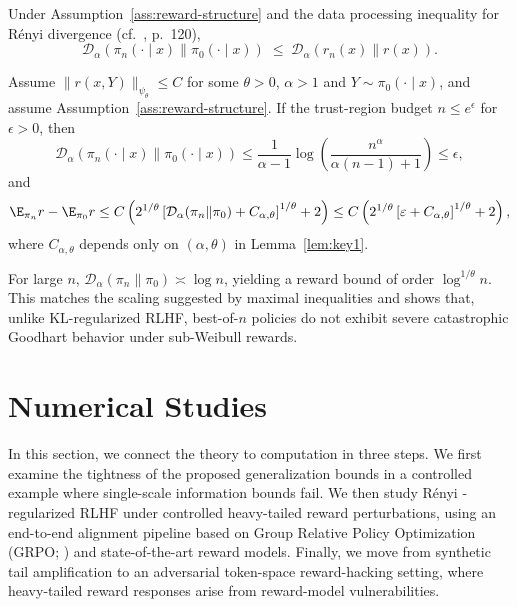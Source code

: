 \documentclass[11pt]{article}
\providecommand{\e}{\varepsilon}
\providecommand{\DD}{\mathcal{D}}
\providecommand{\Renyi}{R\'enyi }
\begin{document}
Under Assumption~\ref{ass:reward-structure} and the data processing inequality
for R\'enyi divergence (cf.\ \citealp{Yihong25}, p.~120),
\[
\DD_\alpha(\pi_n(\cdot\mid x)\|\pi_0(\cdot\mid x))
\;\le\;
\DD_\alpha(r_n(x)\|r(x)).
\]

\begin{theorem}\label{renyiregret}
Assume $\|r(x,Y)\|_{\psi_\theta}\le C$ for some $\theta>0$, $\alpha>1$ and
$Y\sim\pi_0(\cdot\mid x)$, and assume Assumption~\ref{ass:reward-structure}.
If the trust-region budget $n\le e^\epsilon$ for $\epsilon>0$, then
\[
\DD_\alpha(\pi_n(\cdot\mid x)\|\pi_0(\cdot\mid x))
\le \frac{1}{\alpha-1}\log\!\left(\frac{n^\alpha}{\alpha(n-1)+1}\right)
\le  \epsilon,
\]
and
\[
\E_{\pi_n}r-\E_{\pi_0}r
\le
C \left( 2^{1/\theta} \left[ \DD_\alpha(\pi_n \| \pi_0) +C_{\alpha,\theta}\right]^{1/\theta} + 2 \right)
\le
C \left( 2^{1/\theta} \left[ \e +C_{\alpha,\theta}\right]^{1/\theta} + 2\right),
\]
where $C_{\alpha,\theta}$ depends only on $(\alpha,\theta)$ in
Lemma~\ref{lem:key1}.
\end{theorem}

\begin{remark}
For large $n$, $\DD_\alpha(\pi_n\|\pi_0)\asymp\log n$, yielding a reward bound of
order $\log^{1/\theta}n$.  This matches the scaling suggested by maximal
inequalities and shows that, unlike KL-regularized RLHF, best-of-$n$ policies do
not exhibit severe catastrophic Goodhart behavior under sub-Weibull rewards.
\end{remark}

\section{Numerical Studies}\label{sec:experiments}

In this section, we connect the theory to computation in three steps. We first examine the tightness of the proposed generalization bounds in a controlled example where single-scale information bounds fail. We then study
\Renyi\!-regularized RLHF under controlled heavy-tailed reward perturbations, using an end-to-end alignment pipeline based on Group Relative Policy Optimization (GRPO; \citealt{shao2024deepseekmath}) and state-of-the-art reward models. Finally, we move from synthetic tail amplification to an adversarial token-space reward-hacking setting, where heavy-tailed reward responses arise from reward-model vulnerabilities. %
\end{document}
